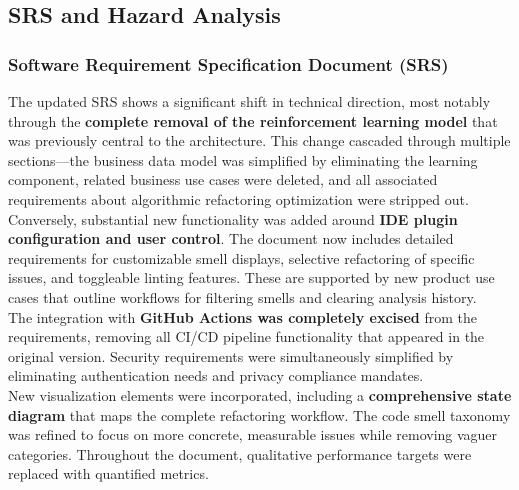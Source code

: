 \documentclass{article}
\begin{document}

\subsection{SRS and Hazard Analysis}

\subsubsection{Software Requirement Specification Document (SRS)}

The updated SRS shows a significant shift in technical direction, most notably through the \textbf{complete removal of the reinforcement learning model} that was previously central to the architecture. This change cascaded through multiple sections—the business data model was simplified by eliminating the learning component, related business use cases were deleted, and all associated requirements about algorithmic refactoring optimization were stripped out.\\

Conversely, substantial new functionality was added around \textbf{IDE plugin configuration and user control}. The document now includes detailed requirements for customizable smell displays, selective refactoring of specific issues, and toggleable linting features. These are supported by new product use cases that outline workflows for filtering smells and clearing analysis history.\\

The integration with \textbf{GitHub Actions was completely excised} from the requirements, removing all CI/CD pipeline functionality that appeared in the original version. Security requirements were simultaneously simplified by eliminating authentication needs and privacy compliance mandates.\\

New visualization elements were incorporated, including a \textbf{comprehensive state diagram} that maps the complete refactoring workflow. The code smell taxonomy was refined to focus on more concrete, measurable issues while removing vaguer categories. Throughout the document, qualitative performance targets were replaced with quantified metrics.\\
\end{document}
